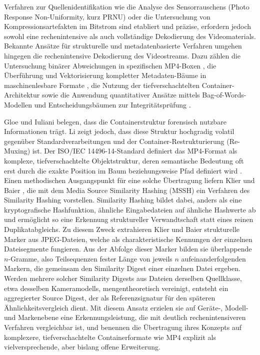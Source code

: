 Verfahren zur Quellenidentifikation wie die Analyse des Sensorrauschens (Photo Response Non-Uniformity, kurz PRNU) \cite{lukas_digital_2006} oder die Untersuchung von Kompressionsartefakten im Bitstrom \cite{li_learning_2024} sind etabliert und präzise, erfordern jedoch sowohl eine rechenintensive als auch vollständige Dekodierung des Videomaterials. Bekannte Ansätze für strukturelle und metadatenbasierte Verfahren umgehen hingegen die rechenintensive Dekodierung des Videostreams. Dazu zählen die Untersuchung binärer Abweichungen in spezifischen MP4-Boxen \cite{hasan_forensic_2021}, die Überführung und Vektorisierung kompletter Metadaten-Bäume in maschinenlesbare Formate \cite{xiang_forensic_2021}, die Nutzung der tiefverschachtelten Container-Architektur \cite{ramos_lopez_digital_2020} sowie die Anwendung quantitativer Ansätze mittels Bag-of-Words-Modellen und Entscheidungsbäumen zur Integritätsprüfung \cite{yang_efficient_2020}.

Gloe \cite{gloe_forensic_2014} und Iuliani \cite{iuliani_video_2019} belegen, dass die Containerstruktur forensisch nutzbare Informationen trägt. Li \cite{li_learning_2024} zeigt jedoch, dass diese Struktur hochgradig volatil gegenüber Standardverarbeitungen und der Container-Restrukturierung (Re-Muxing) ist. Der ISO/IEC 14496-14-Standard definiert das MP4-Format als komplexe, tiefverschachtelte Objektstruktur, deren semantische Bedeutung oft erst durch die exakte Position im Baum beziehungsweise Pfad definiert wird \cite[Kap. 8]{iso_14496-14_2020}. \\

Einen methodischen Ausgangspunkt für eine solche Übertragung liefern Klier und Baier \cite{klier_media_2025}, die mit dem Media Source Similarity Hashing (MSSH) ein Verfahren des Similarity Hashing vorstellen. Similarity Hashing bildet dabei, anders als eine kryptografische Hashfunktion, ähnliche Eingabedateien auf ähnliche Hashwerte ab und ermöglicht so eine Erkennung struktureller Verwandtschaft statt eines reinen Duplikatabgleichs. Zu diesem Zweck extrahieren Klier und Baier strukturelle Marker aus JPEG-Dateien, welche als charakteristische Kennungen der einzelnen Dateisegmente fungieren. Aus der Abfolge dieser Marker bilden sie überlappende \(n\)-Gramme, also Teilsequenzen fester Länge von jeweils \(n\) aufeinanderfolgenden Markern, die gemeinsam den Similarity Digest einer einzelnen Datei ergeben. Werden mehrere solcher Similarity Digests aus Dateien derselben Quellklasse, etwa desselben Kameramodells, mengentheoretisch vereinigt, entsteht ein aggregierter Source Digest, der als Referenzsignatur für den späteren Ähnlichkeitsvergleich dient. Mit diesem Ansatz erzielen sie auf Geräte-, Modell- und Markenebene eine Erkennungsleistung, die mit deutlich rechenintensiveren Verfahren vergleichbar ist, und benennen die Übertragung ihres Konzepts auf komplexere, tiefverschachtelte Containerformate wie MP4 explizit als vielversprechende, aber bislang offene Erweiterung.


